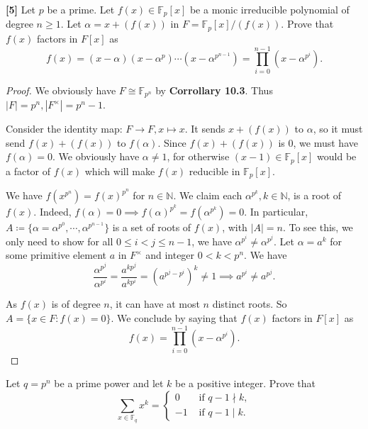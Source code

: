 \documentclass[12pt,letterpaper]{article}
\newcommand{\pnt}[1]{\textbf{[#1]}}
\newcommand{\q}{\pnt{5} }
\newcommand{\tot}[2]{\noindent\textsc{\footnotesize This homework is marked out of \textbf{#1} and graded out of \textbf{#2}}.}
\def\N{{\mathbb N}}
\def\F{{\mathbb F}}
\def\prob#1{\vskip13pt\noindent\llap{{\bf #1:\ }}}
\newcommand{\paren}[1]{\left(#1\right)}
\begin{document}


\prob1\q Let $p$ be a prime. Let $f(x)\in\F_p[x]$ be a monic irreducible polynomial of degree $n\geq1$. Let $\alpha = x + (f(x))$ in $F = \F_p[x]/(f(x))$. Prove that $f(x)$ factors in $F[x]$ as
$$f(x) = (x - \alpha)(x - \alpha^p)\cdots (x - \alpha^{p^{n-1}}) = \prod_{i=0}^{n-1}(x - \alpha^{p^i}).$$
\begin{proof}
	We obviously have $F\cong \F_{p^n}$ by \textbf{Corrollary 10.3}. Thus $|F|=p^n, |F^\times|=p^n-1$.
	
	 Consider the identity map: $F\to F, x\mapsto x$. It sends $x+(f(x))$ to $\alpha$, so it must send $f(x)+(f(x))$ to $f(\alpha)$. Since $f(x)+(f(x))$ is $0$, we must have $f(\alpha)=0$. We obviously have $\alpha\ne 1$, for otherwise $(x-1)\in\F_p[x]$ would be a factor of $f(x)$ which will make $f(x)$ reducible in $\F_p[x]$.

	We have $f(x^{p^n})=f(x)^{p^n}$ for $n\in\N$. We claim each $\alpha^{p^k}, k\in \N$, is a root of $f(x)$. Indeed, $f(\alpha)=0\implies f(\alpha)^{p^k}=f(\alpha^{p^k})=0$. In particular,  $A \coloneqq\{\alpha=\alpha^{p^0},\cdots,\alpha^{p^{n-1}}\}$ is a set of roots of $f(x)$, with $|A|=n$. To see this, we only need to show for all $0\le i<j\le n-1$, we have $\alpha^{p^i}\ne\alpha^{p^j}$. Let $\alpha=a^k$ for some primitive element $a$ in $F^\times$ and integer $0< k<p^n$. We have\[
		\frac{\alpha^{p^j}}{\alpha^{p^i}} =\frac {a^{kp^j}}{a^{kp^i}} =\paren{a^{p^j-p^i}}^k\ne 1\implies a^{p^i}\ne a^{p^j}.
	\]
			
			As $f(x)$ is of degree $n$, it can have at most $n$ distinct roots. So $A= \{x\in F: f(x)=0\}$. We conclude by saying that $f(x)$ factors in $F[x]$ as\[ f(x)=\prod_{i=0}^{n-1}(x - \alpha^{p^i}).\]
	
\end{proof}


\pagebreak

\prob2 Let $q=p^n$ be a prime power and let $k$ be a positive integer. Prove that
$$\sum_{x\in\F_q} x^k = \begin{cases}
    0&\mbox{ if }q-1\nmid k,\\
    -1&\mbox{ if }q-1\mid k.
\end{cases}$$
\end{document}
